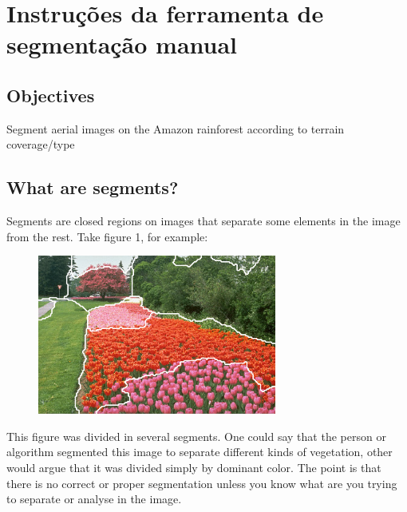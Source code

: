 \apendices

\partapendices



\chapter{Instruções da ferramenta de segmentação manual}\label{apendice:instrucoesManualSeg}
\section*{Objectives}

Segment aerial images on the Amazon rainforest according to terrain coverage/type

\section*{What are segments?}

Segments are closed regions on images that separate some elements in the image from the rest. Take figure 1, for example:

\begin{figure}[h]
  \centering
  \includegraphics[width=0.7\textwidth]{imgs/manualseginstr_fig1}
\end{figure}

This figure was divided in several segments. One could say that the person or algorithm segmented this image to separate different kinds of vegetation, other would argue that it was divided simply by dominant color. The point is that there is no correct or proper segmentation unless you know what are you trying to separate or analyse in the image.


